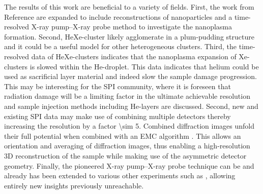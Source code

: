 %
The results of this work are beneficial to a variety of fields. First, the work from Reference \citep{Hoener-2008-JPB,Gorkhover-2016-NatPho} are expanded to include reconstructions of nanoparticles and a time-resolved X-ray pump--X-ray probe method to investigate the nanoplasma formation. Second, HeXe-cluster likely agglomerate in a plum-pudding structure and it could be a useful model for other heterogeneous clusters. Third, the time-resolved data of HeXe-clusters indicates that the nanoplasma expansion of Xe-clusters is slowed within the He-droplet. This data indicates that helium could be used as sacrificial layer material and indeed slow the sample damage progression. This may be interesting for the SPI community, where it is foreseen that radiation damage will be a limiting factor in the ultimate achievable resolution \citep{Aquila-2015-StrucDyn} and sample injection methods including He-layers are discussed. Second, new and existing SPI data may make use of combining multiple detectors thereby increasing the resolution by a factor \num{\sim 5}. Combined diffraction images unfold their full potential when combined with an EMC algorithm \citep{Loh-2009-PRE}. This allows an orientation and averaging of diffraction images, thus enabling a high-resolution 3D reconstruction of the sample while making use of the asymmetric detector geometry. Finally, the pioneered X-ray pump--X-ray probe technique can be and already has been extended to various other experiments such as \cite{Lehmann-2016-PRA,Kimberg-2016-FD,Al-Haddad-2017-unpublished,Ferguson-2016-SciAdv,Picon-2016-NatComm}, allowing entirely new insights previously unreachable.
%
%
%